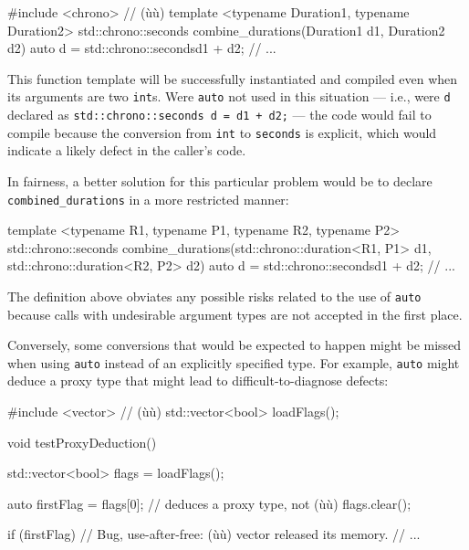 \begin{emcppslisting}
#include <chrono>  // (ù{}ù)
template <typename Duration1, typename Duration2>
std::chrono::seconds combine_durations(Duration1 d1, Duration2 d2)
{
    auto d = std::chrono::seconds{d1 + d2};
    // ...
}
\end{emcppslisting}

\noindent This function template will be successfully instantiated and compiled
even when its arguments are two \lstinline!int!s. Were \lstinline!auto! not
used in this situation --- i.e., were \lstinline!d! declared as
\lstinline!std::chrono::seconds!~\lstinline!d!~\lstinline!=!~\lstinline!d1!~\lstinline!+!~\lstinline!d2;!
--- the code would fail to compile because the conversion from
\lstinline!int! to \lstinline!seconds! is explicit, which would indicate a
likely defect in the caller's code.

In fairness, a better solution for this particular problem would be to declare \lstinline!combined_durations! in a more restricted manner:

\begin{emcppslisting}
template <typename R1, typename P1, typename R2, typename P2>
std::chrono::seconds combine_durations(std::chrono::duration<R1, P1> d1,
                                       std::chrono::duration<R2, P2> d2)
{
    auto d = std::chrono::seconds{d1 + d2};
    // ...
}
\end{emcppslisting}



\noindent The definition above obviates any possible risks related to the use of \lstinline!auto! because calls with undesirable argument types are not accepted in the first place.

Conversely, some conversions that would be expected to happen might be
missed when using \lstinline!auto! instead of an explicitly specified type.
For example, \lstinline!auto! might deduce a proxy type that might lead to
difficult-to-diagnose defects:

\begin{emcppshiddenlisting}[emcppsbatch=e17]
#include <vector>     // (ù{}ù)
std::vector<bool> loadFlags();
\end{emcppshiddenlisting}
\begin{emcppslisting}[emcppsbatch=e17]
void testProxyDeduction()
{
    std::vector<bool> flags = loadFlags();

    auto firstFlag = flags[0];  // deduces a proxy type, not (ù{}ù)
    flags.clear();

    if (firstFlag)  // Bug, use-after-free: (ù{}ù) vector released its memory.
    {
        // ...
    }
}
\end{emcppslisting}


